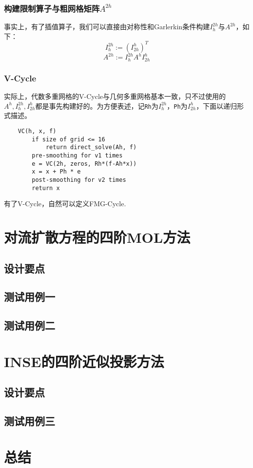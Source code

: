 \documentclass[lang=cn,10pt]{elegantbook}
\begin{document}
\subsection{构建限制算子与粗网格矩阵$A^{2h}$}

事实上，有了插值算子，我们可以直接由对称性和Garlerkin条件构建$I_{h}^{2h}$与$A^{2h}$，如下：
\begin{equation}
  I_{h}^{2h}:=(I_{2h}^{h})^T
\end{equation}
\begin{equation}
  A^{2h}:=I_{h}^{2h}A^hI_{2h}^{h}
\end{equation}

\subsection{V-Cycle}

实际上，代数多重网格的V-Cycle与几何多重网格基本一致，只不过使用的$A^h,I_h^{2h},I_{2h}^h$都是事先构建好的。为方便表述，记\verb|Rh|为$I_{h}^{2h}$，\verb|Ph|为$I_{2h}^{h}$，下面以递归形式描述。

\begin{lstlisting}
    VC(h, x, f)
        if size of grid <= 16
            return direct_solve(Ah, f)
        pre-smoothing for v1 times
        e = VC(2h, zeros, Rh*(f-Ah*x))
        x = x + Ph * e
        post-smoothing for v2 times
        return x
\end{lstlisting}

有了V-Cycle，自然可以定义FMG-Cycle.

\chapter{对流扩散方程的四阶MOL方法}

\section{设计要点}

\section{测试用例一}

\section{测试用例二}

\chapter{INSE的四阶近似投影方法}

\section{设计要点}

\section{测试用例三}

\chapter{总结}
\end{document}
